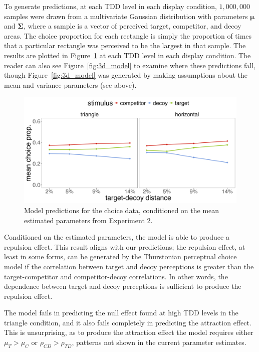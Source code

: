 To generate predictions, at each TDD level in each display condition, $1,000,000$ samples were drawn from a multivariate Gaussian distribution with parameters $\boldsymbol{\mu}$ and $\boldsymbol{\Sigma}$, where a sample is a vector of perceived target, competitor, and decoy areas. The choice proportion for each rectangle is simply the proportion of times that a particular rectangle was perceived to be the largest in that sample. The results are plotted in Figure~\ref{fig:e2_model_preds} at each TDD level in each display condition. The reader can also see Figure~\ref{fig:3d_model} to examine where these predictions fall, though Figure~\ref{fig:3d_model} was generated by making assumptions about the mean and variance parameters (see above). 

\begin{figure}
   \includegraphics[width=\textwidth]{figures/bayes_circle_area_sim_choice_sigma_constant_comp_effect.jpeg}
   \caption{Model predictions for the choice data, conditioned on the mean estimated parameters from Experiment 2.}
   \label{fig:e2_model_preds}
\end{figure}

Conditioned on the estimated parameters, the model is able to produce a repulsion effect. This result aligns with our predictions; the repulsion effect, at least in some forms, can be generated by the Thurstonian perceptual choice model if the correlation between target and decoy perceptions is greater than the target-competitor and competitor-decoy correlations. In other words, the dependence between target and decoy perceptions is sufficient to produce the repulsion effect.

The model fails in predicting the null effect found at high TDD levels in the triangle condition, and it also fails completely in predicting the attraction effect. This is unsurprising, as to produce the attraction effect the model requires either $\mu_{T}>\mu_{C}$ or $\rho_{CD}>\rho_{TD}$, patterns not shown in the current parameter estimates. 

